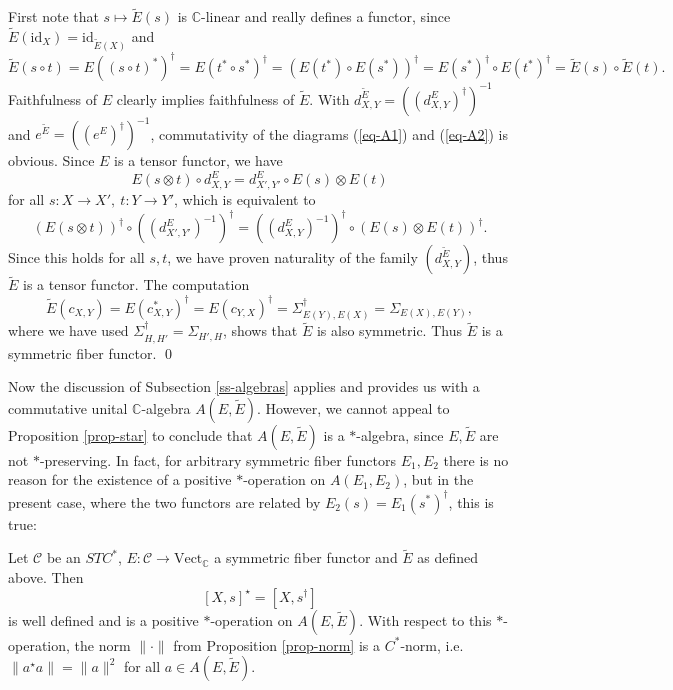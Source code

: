 \documentclass[11pt]{article}
\theoremstyle{definition}
\theoremstyle{definition}
\theoremstyle{remark}
\newcommand{\Vect}{\mathrm{Vect}}
\def\2#1{{\mathcal #1}}
\def\7#1{{\mathbb #1}}
\newcommand{\mcirc}{\circ}
\newcommand{\rarr}{\rightarrow}
\def\id{\mathrm{id}}
\begin{document}
\prf First note that $s\mapsto\widetilde{E}(s)$ is $\7C$-linear and really defines a functor, since 
$\widetilde{E}(\id_X)=\id_{\widetilde{E}(X)}$ and 
\[ \widetilde{E}(s\circ t)=E((s\circ t)^*)^\dagger=E(t^*\circ
s^*)^\dagger=(E(t^*)\circ E(s^*))^\dagger =E(s^*)^\dagger\circ
E(t^*)^\dagger=\widetilde{E}(s)\circ\widetilde{E}(t). \] Faithfulness
of $E$ clearly implies faithfulness of $\widetilde{E}$.  With
$d^{\widetilde{E}}_{X,Y}=((d^E_{X,Y})^\dagger)^{-1}$ and
$e^{\widetilde{E}}=((e^E)^\dagger)^{-1}$, commutativity of the
diagrams (\ref{eq-A1}) and (\ref{eq-A2}) is obvious. Since $E$ is a
tensor functor, we have
\[ E(s\otimes t)\mcirc d^E_{X,Y}=d^E_{X',Y'}\mcirc E(s)\otimes E(t) \]
for all $s:X\rarr X',\ t:Y\rarr Y'$, which is equivalent to
\[ (E(s\otimes t))^\dagger\mcirc((d^E_{X',Y'})^{-1})^\dagger 
   =((d^E_{X,Y})^{-1})^\dagger\mcirc(E(s)\otimes E(t))^\dagger. \]
Since this holds for all $s,t$, we have proven naturality of the family
$(d^{\widetilde{E}}_{X,Y})$, thus $\widetilde{E}$ is a tensor functor. The computation
\[
\widetilde{E}(c_{X,Y})=E(c_{X,Y}^*)^\dagger=E(c_{Y,X})^\dagger=\Sigma_{E(Y),E(X)}^\dagger
=\Sigma_{E(X),E(Y)}, \] where we have used
$\Sigma_{H,H'}^\dagger=\Sigma_{H',H}$, shows that $\widetilde{E}$ is
also symmetric. Thus $\widetilde{E}$ is a symmetric fiber functor.
\qed

Now the discussion of Subsection \ref{ss-algebras} applies and
provides us with a commutative unital $\7C$-algebra
$A(E,\widetilde{E})$. However, we cannot appeal to Proposition
\ref{prop-star} to conclude that $A(E,\widetilde{E})$ is a
$*$-algebra, since $E,\widetilde{E}$ are not $*$-preserving.  In fact,
for arbitrary symmetric fiber functors $E_1,E_2$ there is no reason
for the existence of a positive $*$-operation on $A(E_1,E_2)$, but in
the present case, where the two functors are related by
$E_2(s)=E_1(s^*)^\dagger$, this is true:

\bprop Let $\2C$ be an $STC^*$, $E:\2C\rarr\Vect_\7C$ a symmetric fiber functor and $\widetilde{E}$
as defined above. Then 
\[ [X,s]^\star=[X,s^\dagger] \] is well defined and is a positive
$*$-operation on $A(E,\widetilde{E})$. With respect to this
$*$-operation, the norm $\|\cdot\|$ from Proposition \ref{prop-norm}
is a $C^*$-norm, i.e.\ $\|a^\star a\|=\|a\|^2$ for all $a\in
A(E,\widetilde{E})$.  \eprop
\end{document}
